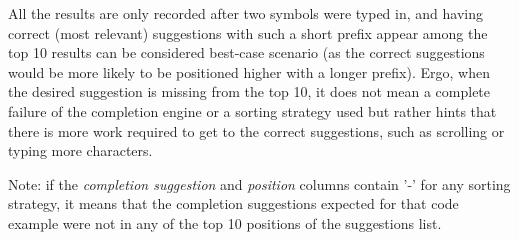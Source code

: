 \documentclass[sigplan,screen]{acmart}
\begin{document}
All the results are only recorded after two symbols were typed in, and having correct (most relevant) suggestions with such a short prefix appear among the top 10 results can be considered best-case scenario (as the correct suggestions would be more likely to be positioned higher with a longer prefix). Ergo, when the desired suggestion is missing from the top 10, it does not mean a complete failure of the completion engine or a sorting strategy used but rather hints that there is more work required to get to the correct suggestions, such as scrolling or typing more characters.

Note: if the \textit{completion suggestion} and \textit{position} columns contain '-' for any sorting strategy, it means that the completion suggestions expected for that code example were not in any of the top 10 positions of the suggestions list.
\end{document}
